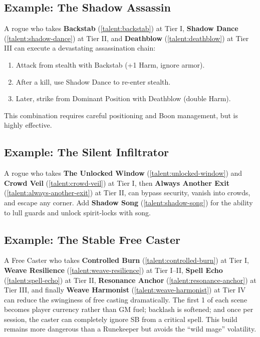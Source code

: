 {{\subsection*{Example: The Shadow Assassin}
\label{sec:shadow-assassin-example}
A rogue who takes \textbf{Backstab} (\ref{talent:backstab}) at Tier I, \textbf{Shadow Dance} (\ref{talent:shadow-dance}) at Tier II, and \textbf{Deathblow} (\ref{talent:deathblow}) at Tier III can execute a devastating assassination chain:
\begin{enumerate}
\item Attack from stealth with Backstab (+1 Harm, ignore armor).
\item After a kill, use Shadow Dance to re-enter stealth.
\item Later, strike from Dominant Position with Deathblow (double Harm).
\end{enumerate}
This combination requires careful positioning and Boon management, but is highly effective.

\subsection*{Example: The Silent Infiltrator}
\label{sec:silent-infiltrator-example}
A rogue who takes \textbf{The Unlocked Window} (\ref{talent:unlocked-window}) and \textbf{Crowd Veil} (\ref{talent:crowd-veil}) at Tier I, then \textbf{Always Another Exit} (\ref{talent:always-another-exit}) at Tier II, can bypass security, vanish into crowds, and escape any corner. Add \textbf{Shadow Song} (\ref{talent:shadow-song}) for the ability to lull guards and unlock spirit-locks with song.

\subsection*{Example: The Stable Free Caster}
\label{sec:stable-freecaster-example}
A Free Caster who takes \textbf{Controlled Burn} (\ref{talent:controlled-burn}) at Tier I, \textbf{Weave Resilience} (\ref{talent:weave-resilience}) at Tier I--II, \textbf{Spell Echo} (\ref{talent:spell-echo}) at Tier II, \textbf{Resonance Anchor} (\ref{talent:resonance-anchor}) at Tier III, and finally \textbf{Weave Harmonist} (\ref{talent:weave-harmonist}) at Tier IV can reduce the swinginess of free casting dramatically. The first 1 of each scene becomes player currency rather than GM fuel; backlash is softened; and once per session, the caster can completely ignore SB from a critical spell. This build remains more dangerous than a Runekeeper but avoids the ``wild mage'' volatility.

}}
